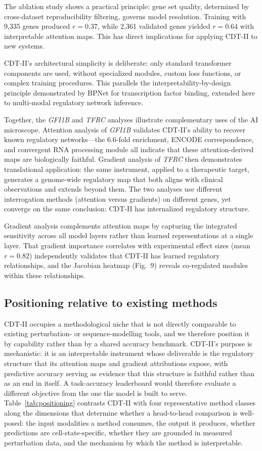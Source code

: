 \documentclass[12pt,a4paper]{article}
\begin{document}
The ablation study shows a practical principle: gene set quality, determined by cross-dataset reproducibility filtering, governs model resolution. Training with 9,335 genes produced $r = 0.37$, while 2,361 validated genes yielded $r = 0.64$ with interpretable attention maps. This has direct implications for applying CDT-II to new systems.

CDT-II's architectural simplicity is deliberate: only standard transformer components are used, without specialized modules, custom loss functions, or complex training procedures. This parallels the interpretability-by-design principle demonstrated by BPNet \citep{avsec2021bpnet} for transcription factor binding, extended here to multi-modal regulatory network inference.

Together, the \textit{GFI1B} and \textit{TFRC} analyses illustrate complementary uses of the AI microscope. Attention analysis of \textit{GFI1B} validates CDT-II's ability to recover known regulatory networks---the 6.6-fold enrichment, ENCODE correspondence, and convergent RNA processing module all indicate that these attention-derived maps are biologically faithful. Gradient analysis of \textit{TFRC} then demonstrates translational application: the same instrument, applied to a therapeutic target, generates a genome-wide regulatory map that both aligns with clinical observations and extends beyond them. The two analyses use different interrogation methods (attention versus gradients) on different genes, yet converge on the same conclusion: CDT-II has internalized regulatory structure.

Gradient analysis complements attention maps by capturing the integrated sensitivity across all model layers rather than learned representations at a single layer. That gradient importance correlates with experimental effect sizes (mean $r = 0.82$) independently validates that CDT-II has learned regulatory relationships, and the Jacobian heatmap (Fig.~9) reveals co-regulated modules within these relationships.

\subsection{Positioning relative to existing methods}

CDT-II occupies a methodological niche that is not directly comparable to existing perturbation- or sequence-modelling tools, and we therefore position it by capability rather than by a shared accuracy benchmark. CDT-II's purpose is mechanistic: it is an interpretable instrument whose deliverable is the regulatory structure that its attention maps and gradient attributions expose, with predictive accuracy serving as evidence that this structure is faithful rather than as an end in itself. A task-accuracy leaderboard would therefore evaluate a different objective from the one the model is built to serve. Table~\ref{tab:positioning} contrasts CDT-II with four representative method classes along the dimensions that determine whether a head-to-head comparison is well-posed: the input modalities a method consumes, the output it produces, whether predictions are cell-state-specific, whether they are grounded in measured perturbation data, and the mechanism by which the method is interpretable.
\end{document}
